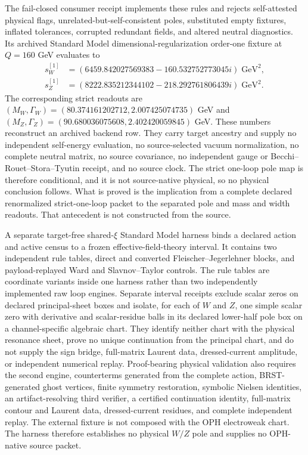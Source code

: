 The fail-closed consumer receipt implements these rules and rejects
self-attested physical flags, unrelated-but-self-consistent poles, substituted empty
fixtures, inflated tolerances, corrupted redundant fields, and altered
neutral diagnostics. Its archived Standard Model dimensional-regularization
order-one fixture at \(Q=160\) GeV
evaluates to
\[
\begin{aligned}
s_W^{[1]}&=(6459.842027569383-160.532752773045i)\;\mathrm{GeV}^2,\\
s_Z^{[1]}&=(8222.835212344102-218.292761806439i)\;\mathrm{GeV}^2.
\end{aligned}
\]
The corresponding strict readouts are
\((M_W,\Gamma_W)=(80.374161202712,2.007425074735)\) GeV and
\((M_Z,\Gamma_Z)=(90.680036075608,2.402420059845)\) GeV.  These numbers
reconstruct an archived backend row. They carry target ancestry and supply no
independent self-energy evaluation, no source-selected vacuum normalization, no
complete neutral matrix, no source covariance, no independent gauge or
Becchi--Rouet--Stora--Tyutin receipt, and no source clock. The strict one-loop
pole map is therefore conditional, and it is not source-native physical, so no
physical conclusion follows. What is proved is the implication from a
complete declared renormalized strict-one-loop packet to the separated pole and
mass and width readouts. That antecedent is not constructed from the source.

A separate target-free shared-\(\xi\) Standard Model harness binds a declared
action and active census to a frozen effective-field-theory interval. It
contains two independent rule tables, direct and converted
Fleischer--Jegerlehner blocks, and payload-replayed Ward and
Slavnov--Taylor controls. The rule tables are coordinate variants inside one
harness rather than two independently implemented raw loop engines. Separate
interval receipts exclude scalar zeros on declared principal-sheet boxes and
isolate, for each of \(W\) and \(Z\), one simple scalar zero with derivative
and scalar-residue balls in its declared lower-half pole box on a
channel-specific algebraic chart. They identify neither chart with the
physical resonance sheet, prove no unique continuation from the principal
chart, and do not supply the sign bridge, full-matrix
Laurent data, dressed-current amplitude, or independent numerical replay.
Proof-bearing physical validation also requires the second engine,
counterterms generated from the complete action, BRST-generated ghost
vertices, finite symmetry restoration, symbolic Nielsen identities, an
artifact-resolving third verifier, a certified continuation identity,
full-matrix contour and Laurent data, dressed-current residues, and complete
independent replay. The external fixture is not composed with the OPH
electroweak chart. The harness therefore establishes no physical \(W/Z\) pole
and supplies no OPH-native source packet.
